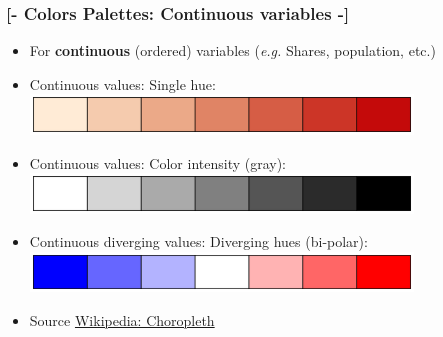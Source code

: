\documentclass[xcolor=x11names,aspectratio=169, compress]{beamer}
\renewcommand{\(}{\begin{columns}}
\renewcommand{\)}{\end{columns}}
\newcommand{\<}[1]{\begin{column}{#1}}
\renewcommand{\>}{\end{column}}
\begin{document}
\begin{frame} %
\frametitle{\textcolor{brique}{[-  \textbf{Colors Palettes:}  Continuous variables  -]}}
\begin{center}
\begin{itemize}[<+-|alert@+>]
    \item[] For \textbf{continuous} (ordered) variables  (\textit{e.g.} Shares, population, etc.)
    \item Continuous values: Single hue: \hfill \includegraphics[width = 0.8\textwidth]{M5-ColorPaletteSingleHue.png}
    \item Continuous values: Color intensity (gray): \hfill \includegraphics[width = 0.8\textwidth]{M5-ColorPaletteGreyscale.png}
    \item Continuous diverging values: Diverging hues (bi-polar): \hfill \includegraphics[width = 0.8\textwidth]{M5-ColorPaletteBiPolar.png}
  \item[] \textcolor{gris}{\footnotesize{Source \href{https://en.wikipedia.org/wiki/Choropleth_map}{Wikipedia: Choropleth}}}
\end{itemize}
\end{center}
\end{frame}
\end{document}
